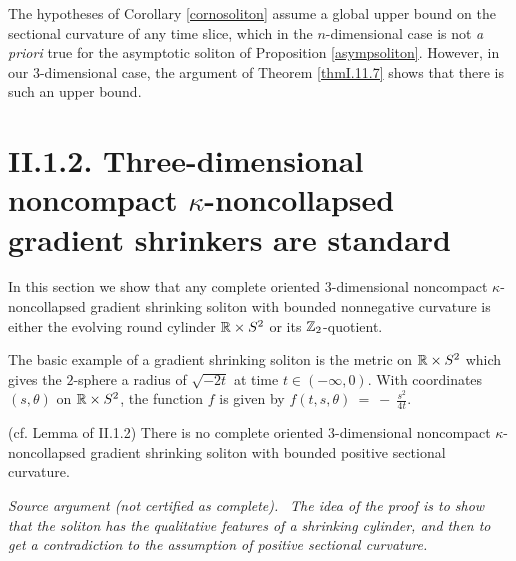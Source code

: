 \begin{remark}
  \label{rem:kl-getting-uniform-value-existence-ricci-solitons}
 The hypotheses of Corollary \ref{cornosoliton}
assume a global upper bound on the sectional curvature of any time slice,
which in the $n$-dimensional case
is not {\it a priori} true for the asymptotic soliton of
Proposition \ref{asympsoliton}.  However, in our $3$-dimensional case,
the argument of Theorem \ref{thmI.11.7} shows that there is such an upper bound.
\end{remark}

\section{II.1.2. Three-dimensional noncompact $\kappa$-noncollapsed
gradient shrinkers are standard}
\label{II.1.2}

In this section we show that any complete oriented
$3$-dimensional noncompact
$\kappa$-noncollapsed
gradient shrinking soliton with
bounded nonnegative curvature
is either the evolving round cylinder ${\mathbb R} \times S^2$ or its
${\mathbb Z}_2$-quotient.

The basic example of a gradient shrinking soliton is the
metric on ${\mathbb R} \times S^2$ which gives the $2$-sphere
a radius of $\sqrt{-2t}$ at time $t \in (-\infty, 0)$. With
coordinates $(s, \theta)$ on ${\mathbb R} \times S^2$, the function $f$ is given by
$f(t, s, \theta) \: = \: - \: \frac{s^2}{4t}$.

\begin{lemma}
  \label{lem:kl-three-dimensional-noncompact-noncollapsed-gradient-shrinkers-standard-existence-kappa-solutions}
 \label{nosoliton} (cf. Lemma of II.1.2)
There is no complete oriented $3$-dimensional noncompact
$\kappa$-noncollapsed gradient shrinking soliton with
bounded positive sectional curvature.
\end{lemma}
\par\medskip\noindent\textit{Source argument (not certified as complete).}\ \begingroup\itshape
The idea of the proof is to show that the soliton has the qualitative
features of a shrinking cylinder, and then to get a contradiction to
the assumption of positive sectional curvature.


